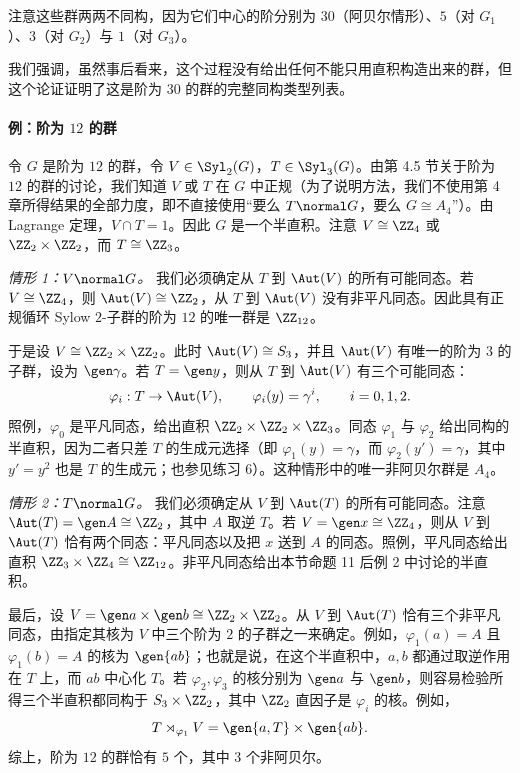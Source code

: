 注意这些群两两不同构，因为它们中心的阶分别为 $30$（阿贝尔情形）、$5$（对 $G_1$）、$3$（对 $G_2$）与 $1$（对 $G_3$）。

我们强调，虽然事后看来，这个过程没有给出任何不能只用直积构造出来的群，但这个论证证明了这是阶为 $30$ 的群的完整同构类型列表。

\paragraph{例：阶为 $12$ 的群}
令 $G$ 是阶为 $12$ 的群，令 $V\in\Syl_2(G)$，$T\in\Syl_3(G)$。由第 4.5 节关于阶为 $12$ 的群的讨论，我们知道 $V$ 或 $T$ 在 $G$ 中正规（为了说明方法，我们不使用第 4 章所得结果的全部力度，即不直接使用“要么 $T\normal G$，要么 $G\cong A_4$”）。由 Lagrange 定理，$V\cap T=1$。因此 $G$ 是一个半直积。注意 $V\cong\ZZ_4$ 或 $\ZZ_2\times\ZZ_2$，而 $T\cong\ZZ_3$。

\emph{情形 1：$V\normal G$。}
我们必须确定从 $T$ 到 $\Aut(V)$ 的所有可能同态。若 $V\cong\ZZ_4$，则 $\Aut(V)\cong\ZZ_2$，从 $T$ 到 $\Aut(V)$ 没有非平凡同态。因此具有正规循环 Sylow $2$-子群的阶为 $12$ 的唯一群是 $\ZZ_{12}$。

于是设 $V\cong\ZZ_2\times\ZZ_2$。此时 $\Aut(V)\cong S_3$，并且 $\Aut(V)$ 有唯一的阶为 $3$ 的子群，设为 $\gen\gamma$。若 $T=\gen y$，则从 $T$ 到 $\Aut(V)$ 有三个可能同态：
\[
  \varphi_i:T\to\Aut(V),
  \qquad
  \varphi_i(y)=\gamma^i,
  \qquad i=0,1,2.
\]
照例，$\varphi_0$ 是平凡同态，给出直积 $\ZZ_2\times\ZZ_2\times\ZZ_3$。同态 $\varphi_1$ 与 $\varphi_2$ 给出同构的半直积，因为二者只差 $T$ 的生成元选择（即 $\varphi_1(y)=\gamma$，而 $\varphi_2(y')=\gamma$，其中 $y'=y^2$ 也是 $T$ 的生成元；也参见练习 6）。这种情形中的唯一非阿贝尔群是 $A_4$。

\emph{情形 2：$T\normal G$。}
我们必须确定从 $V$ 到 $\Aut(T)$ 的所有可能同态。注意 $\Aut(T)=\gen A\cong\ZZ_2$，其中 $A$ 取逆 $T$。若 $V=\gen x\cong\ZZ_4$，则从 $V$ 到 $\Aut(T)$ 恰有两个同态：平凡同态以及把 $x$ 送到 $A$ 的同态。照例，平凡同态给出直积 $\ZZ_3\times\ZZ_4\cong\ZZ_{12}$。非平凡同态给出本节命题 11 后例 2 中讨论的半直积。

最后，设 $V=\gen a\times\gen b\cong\ZZ_2\times\ZZ_2$。从 $V$ 到 $\Aut(T)$ 恰有三个非平凡同态，由指定其核为 $V$ 中三个阶为 $2$ 的子群之一来确定。例如，$\varphi_1(a)=A$ 且 $\varphi_1(b)=A$ 的核为 $\gen{ab}$；也就是说，在这个半直积中，$a,b$ 都通过取逆作用在 $T$ 上，而 $ab$ 中心化 $T$。若 $\varphi_2,\varphi_3$ 的核分别为 $\gen a$ 与 $\gen b$，则容易检验所得三个半直积都同构于 $S_3\times\ZZ_2$，其中 $\ZZ_2$ 直因子是 $\varphi_i$ 的核。例如，
\[
  T\rtimes_{\varphi_1}V=\gen{a,T}\times\gen{ab}.
\]
综上，阶为 $12$ 的群恰有 $5$ 个，其中 $3$ 个非阿贝尔。

